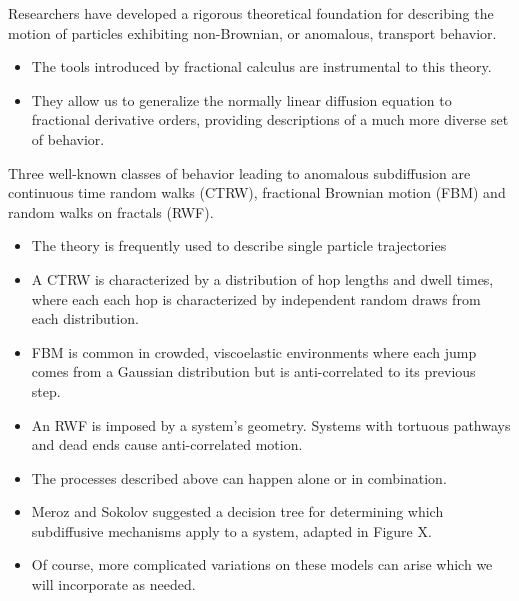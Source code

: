 \documentclass{article}
\begin{document}
  \noindent Researchers have developed a rigorous theoretical foundation for describing
  the motion of particles exhibiting non-Brownian, or anomalous, transport behavior.
  \begin{itemize}
    \item The tools introduced by fractional calculus are instrumental to this theory. 
    \item They allow us to generalize the normally linear diffusion equation to fractional
    derivative orders, providing descriptions of a much more diverse set of behavior. \cite{klages_anomalous_2008} %
  \end{itemize}
  
  \noindent Three well-known classes of behavior leading to anomalous subdiffusion are 
  continuous time random walks (CTRW), fractional Brownian motion
  (FBM) and random walks on fractals (RWF).\cite{meroz_toolbox_2015}
  \begin{itemize}
    \item The theory is frequently used to describe single particle trajectories
    \item A CTRW is characterized by a distribution of hop lengths and 
    dwell times, where each each hop is characterized by independent random draws from 
    each distribution.\cite{montroll_random_1965,morrin_three_2018}
    \item FBM is common in crowded, viscoelastic environments where each jump comes 
    from a Gaussian distribution but is anti-correlated to its previous 
    step.~\cite{mandelbrot_fractional_1968,jeon_fractional_2010,banks_anomalous_2005}
    \item An RWF is imposed by a system's geometry. Systems with tortuous pathways and dead
    ends cause anti-correlated motion.\cite{meroz_toolbox_2015,neusius_subdiffusion_2008}
    \item The processes described above can happen alone or in combination. 
    \item Meroz and Sokolov suggested a decision tree for determining which subdiffusive
    mechanisms apply to a system, adapted in Figure X. 
    \item Of course, more complicated variations on these models can arise which we 
    will incorporate as needed.	  %
  \end{itemize}
  
\end{document}
